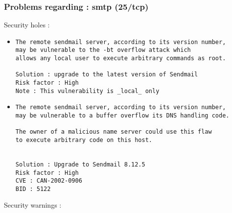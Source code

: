 \documentclass{article}
\begin{document}
\subsubsection{Problems regarding : smtp (25/tcp)}
Security holes :\\
\begin{itemize}
\item \begin{verbatim}
The remote sendmail server, according to its version number,
may be vulnerable to the -bt overflow attack which
allows any local user to execute arbitrary commands as root.

Solution : upgrade to the latest version of Sendmail
Risk factor : High
Note : This vulnerability is _local_ only
\end{verbatim}\item \begin{verbatim}
The remote sendmail server, according to its version number,
may be vulnerable to a buffer overflow its DNS handling code.

The owner of a malicious name server could use this flaw
to execute arbitrary code on this host.


Solution : Upgrade to Sendmail 8.12.5
Risk factor : High
CVE : CAN-2002-0906
BID : 5122
\end{verbatim}\end{itemize}
Security warnings :\\
\end{document}
